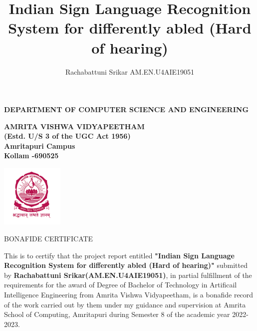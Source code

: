 \documentclass[oneside,12pt]{Classes/CUEDthesisPSnPDF}
\title{Indian Sign Language Recognition System for differently abled (Hard of hearing)}
\author{Rachabattuni Srikar AM.EN.U4AIE19051}
\begin{document}
\maketitle


\begin{center}


	{\normalsize {\bfseries{DEPARTMENT OF COMPUTER SCIENCE AND ENGINEERING\\[1ex]}}}


	{\normalsize {\bfseries{AMRITA VISHWA VIDYAPEETHAM \\ (Estd. U/S 3 of the UGC Act 1956) \\[1ex]Amritapuri  Campus \\[1ex] Kollam -690525\\[1ex]}}}

	\includegraphics[width=30mm]{UNIVEMBLEM.png}


	\rmfamily\bfseries\upshape\Large

	BONAFIDE CERTIFICATE \\[2ex] %

\end{center}


\rmfamily\mdseries\upshape\normalsize

This is to certify that the project report entitled \textbf{"Indian Sign Language Recognition System for differently abled (Hard of hearing)"} submitted by \textbf{Rachabattuni Srikar(AM.EN.U4AIE19051)}, in partial fulfillment of the requirements for the award of Degree of Bachelor of Technology in Artificail Intelligence Engineering from Amrita Vishwa Vidyapeetham, is a bonafide record of the work carried out by them under my guidance and supervision at Amrita School of Computing, Amritapuri during Semester 8 of the academic year 2022-2023.
\end{document}
